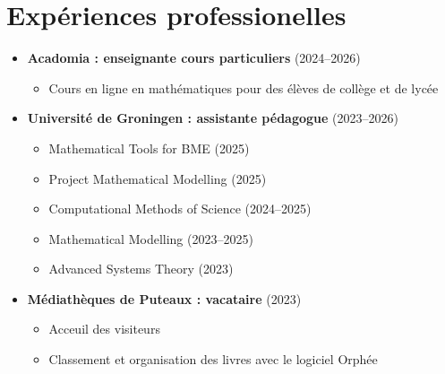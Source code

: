 \section*{Expériences professionelles}
\begin{itemize}
\item \textbf{Acadomia : enseignante cours particuliers} (2024--2026)
\begin{itemize}
    \item Cours en ligne en mathématiques pour des élèves de collège et de lycée
\end{itemize}
\item \textbf{Université de Groningen : assistante pédagogue} (2023--2026)
\begin{itemize}
    \item Mathematical Tools for BME (2025)
    \item Project Mathematical Modelling (2025)
    \item Computational Methods of Science (2024--2025)
    \item Mathematical Modelling (2023--2025) 
    \item Advanced Systems Theory (2023)
\end{itemize}
\item \textbf{Médiathèques de Puteaux : vacataire} (2023) 
\begin{itemize}
    \item Acceuil des visiteurs 
    \item Classement et organisation des livres avec le logiciel Orphée
\end{itemize}
\end{itemize}